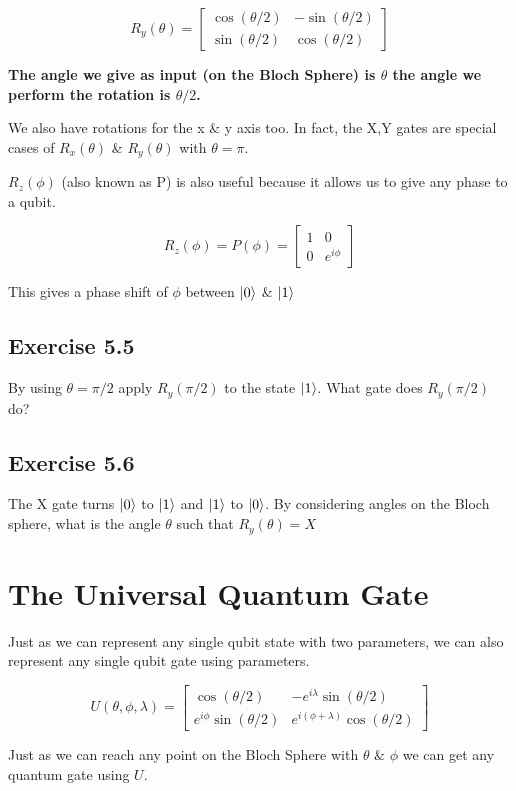 \documentclass{book}
\begin{document}
$$
R_y(\theta) = \begin{bmatrix} \cos(\theta /2) & -\sin(\theta /2) \\ \sin(\theta /2) & \cos(\theta /2) \end{bmatrix}
$$

\textbf{The angle we give as input (on the Bloch Sphere) is $\theta$ the angle we perform the rotation is $\theta/2$.}

We also have rotations for the x \& y axis too. In fact, the X,Y gates are special cases of $R_x(\theta)$ \& $R_y(\theta)$ with $\theta = \pi$. 

$R_z(\phi)$ (also known as P) is also useful because it allows us to give any phase to a qubit. 

$$
R_z(\phi) = P(\phi) = \begin{bmatrix} 1 & 0 \\ 0 & e^{i\phi} \end{bmatrix}
$$

This gives a phase shift of $\phi$ between $\ket{0}$ \& $\ket{1}$


\subsection{Exercise 5.5}
By using $\theta = \pi/2$ apply $R_y(\pi/2)$ to the state $\ket{1}$. What gate does $R_y(\pi/2)$ do? 
 
\subsection{Exercise 5.6} 
The X gate turns $\ket{0}$ to $\ket{1}$ and $\ket{1}$ to $\ket{0}$. By considering angles on the Bloch sphere, what is the angle $\theta$ such that $R_y(\theta) = X$


\section{ The Universal Quantum Gate }

Just as we can represent any single qubit state with two parameters, we can also represent any single qubit gate using parameters. 

$$
U(\theta, \phi, \lambda) = \begin{bmatrix} \cos(\theta/2) & -e^{i\lambda}\sin(\theta/2) \\ e^{i\phi}\sin(\theta/2) & e^{i(\phi + \lambda)}\cos(\theta/2) \end{bmatrix} 
$$

Just as we can reach any point on the Bloch Sphere with $\theta$ \& $\phi$ we can get any quantum gate using $U$. 
\end{document}
